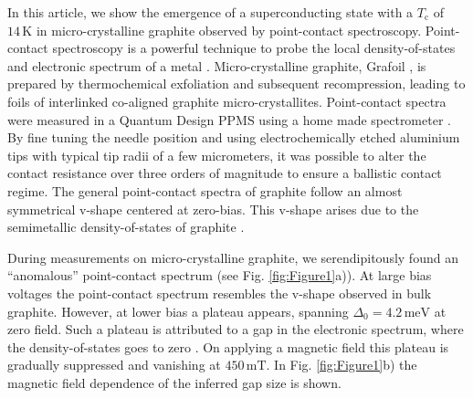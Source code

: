 \documentclass[aps,prb,reprint,twocolumn,showpacs]{revtex4-1}
\begin{document}
In this article, we show the emergence of a superconducting state with a $T_\mathrm{c}$ of $14\,\mathrm{K}$ in micro-crystalline graphite observed by point-contact spectroscopy. Point-contact spectroscopy is a powerful technique to probe the local density-of-states and electronic spectrum of a metal \cite{Yanson81,Jansen80}. Micro-crystalline graphite, Grafoil \cite{UCAR}, is prepared by thermochemical exfoliation and subsequent recompression, leading to foils of interlinked co-aligned graphite micro-crystallites.  Point-contact spectra were measured in a Quantum Design PPMS using a home made spectrometer \cite{Arnold15Thesis}. By fine tuning the needle position and using electrochemically etched aluminium tips with typical tip radii of a few micrometers, it was possible to alter the contact resistance over three orders of magnitude to ensure a ballistic contact regime. The general point-contact spectra of graphite follow an almost symmetrical v-shape centered at zero-bias. This v-shape arises due to the semimetallic density-of-states of graphite \cite{McClure57}.%

During measurements on micro-crystalline graphite, we serendipitously found an "`anomalous"' point-contact spectrum (see Fig. \ref{fig:Figure1}a)). At large bias voltages the point-contact spectrum resembles the v-shape observed in bulk graphite. However, at lower bias a plateau appears, spanning $\Delta_0 = 4.2\,\mathrm{meV}$ at zero field. Such a plateau is  attributed to a gap in the electronic spectrum, where the density-of-states goes to zero \cite{Blonder82}. On applying a magnetic field this plateau is gradually suppressed and vanishing at $450\,\mathrm{mT}$. In Fig. \ref{fig:Figure1}b) the magnetic field dependence of the inferred gap size is shown.
\end{document}
